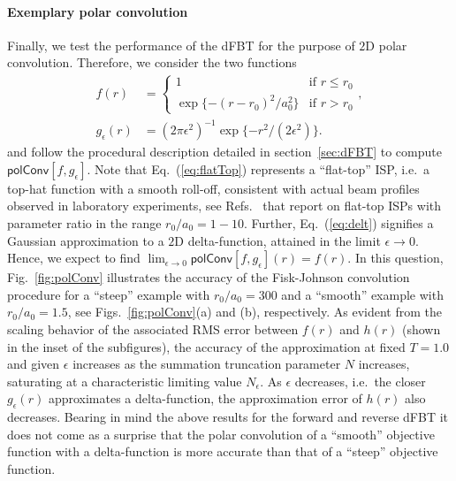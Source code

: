 \documentclass[review]{elsarticle}
\begin{document}
\paragraph{Exemplary polar convolution}
Finally, we test the performance of the dFBT for the purpose of $2$D polar 
convolution. Therefore, we consider the two functions
\begin{align}
f(r) &= \begin{cases}
          1                        & \text{if $r \le r_0$} \\
          \exp\{-(r-r_0)^2/a_0^2\} & \text{if $r>r_0$} 
        \end{cases},\label{eq:flatTop}\\
g_\epsilon(r) &= (2\pi \epsilon^2)^{-1} \exp\{-r^2/(2\epsilon^2)\}\label{eq:delt}.
\end{align}
and follow the procedural description detailed in section~\ref{sec:dFBT}
to compute ${\mathsf{polConv}}[f,g_\epsilon]$. 
Note that Eq.~(\ref{eq:flatTop}) represents a ``flat-top'' ISP, i.e.\ a top-hat
function with a smooth roll-off, consistent with actual beam profiles observed in
laboratory experiments, see Refs.~\cite{Paltauf:1997, Paltauf:1998,
Paltauf:2000, DAlessandro:2012, Blumenroether:2016} that report on 
flat-top ISPs with parameter ratio in the range $r_0/a_0=1-10$.  
Further, Eq.~(\ref{eq:delt}) signifies a Gaussian approximation to a $2$D
delta-function, attained in the limit $\epsilon \to 0$. Hence, we expect to 
find \mbox{$\lim_{\epsilon \to 0} {\mathsf{polConv}}[f,g_\epsilon](r)= f(r)$}.
In this question, Fig.~\ref{fig:polConv} illustrates the accuracy of the
Fisk-Johnson convolution procedure for a ``steep'' example with $r_0/a_0=300$
and a ``smooth'' example with $r_0/a_0=1.5$, see Figs.~\ref{fig:polConv}(a) and
(b), respectively. As evident from the scaling behavior of the associated 
RMS error between $f(r)$ and $h(r)$ (shown in the inset of the subfigures), the 
accuracy of the approximation at fixed $T=1.0$ and given $\epsilon$ 
increases as the summation truncation parameter $N$ increases, saturating
at a characteristic limiting value $N_\epsilon$. As $\epsilon$ decreases, i.e.\
the closer $g_\epsilon(r)$ approximates a delta-function, the approximation
error of $h(r)$ also decreases. Bearing in mind the above results for the
forward and reverse dFBT it does not come as a surprise that the polar
convolution of a ``smooth'' objective function with a delta-function is more
accurate than that of a ``steep'' objective function.

\end{document}
